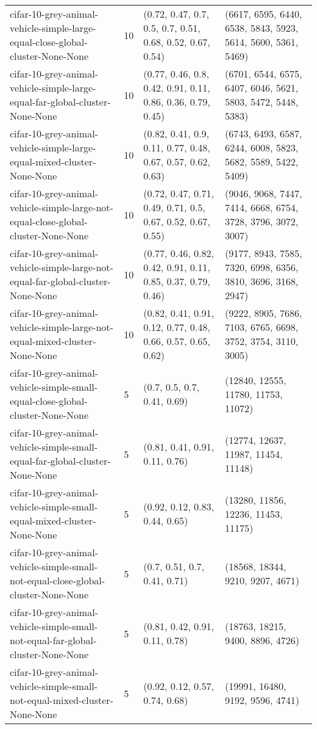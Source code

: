 \begin{longtable}{llll}
         cifar-10-grey-animal-vehicle-simple-large-equal-close-global-cluster-None-None &             10 &    (0.72, 0.47, 0.7, 0.5, 0.7, 0.51, 0.68, 0.52, 0.67, 0.54) & (6617, 6595, 6440, 6538, 5843, 5923, 5614, 5600, 5361, 5469) \\
           cifar-10-grey-animal-vehicle-simple-large-equal-far-global-cluster-None-None &             10 &  (0.77, 0.46, 0.8, 0.42, 0.91, 0.11, 0.86, 0.36, 0.79, 0.45) & (6701, 6544, 6575, 6407, 6046, 5621, 5803, 5472, 5448, 5383) \\
                cifar-10-grey-animal-vehicle-simple-large-equal-mixed-cluster-None-None &             10 &  (0.82, 0.41, 0.9, 0.11, 0.77, 0.48, 0.67, 0.57, 0.62, 0.63) & (6743, 6493, 6587, 6244, 6008, 5823, 5682, 5589, 5422, 5409) \\
     cifar-10-grey-animal-vehicle-simple-large-not-equal-close-global-cluster-None-None &             10 &  (0.72, 0.47, 0.71, 0.49, 0.71, 0.5, 0.67, 0.52, 0.67, 0.55) & (9046, 9068, 7447, 7414, 6668, 6754, 3728, 3796, 3072, 3007) \\
       cifar-10-grey-animal-vehicle-simple-large-not-equal-far-global-cluster-None-None &             10 & (0.77, 0.46, 0.82, 0.42, 0.91, 0.11, 0.85, 0.37, 0.79, 0.46) & (9177, 8943, 7585, 7320, 6998, 6356, 3810, 3696, 3168, 2947) \\
            cifar-10-grey-animal-vehicle-simple-large-not-equal-mixed-cluster-None-None &             10 & (0.82, 0.41, 0.91, 0.12, 0.77, 0.48, 0.66, 0.57, 0.65, 0.62) & (9222, 8905, 7686, 7103, 6765, 6698, 3752, 3754, 3110, 3005) \\
         cifar-10-grey-animal-vehicle-simple-small-equal-close-global-cluster-None-None &              5 &                                  (0.7, 0.5, 0.7, 0.41, 0.69) &                          (12840, 12555, 11780, 11753, 11072) \\
           cifar-10-grey-animal-vehicle-simple-small-equal-far-global-cluster-None-None &              5 &                               (0.81, 0.41, 0.91, 0.11, 0.76) &                          (12774, 12637, 11987, 11454, 11148) \\
                cifar-10-grey-animal-vehicle-simple-small-equal-mixed-cluster-None-None &              5 &                               (0.92, 0.12, 0.83, 0.44, 0.65) &                          (13280, 11856, 12236, 11453, 11175) \\
     cifar-10-grey-animal-vehicle-simple-small-not-equal-close-global-cluster-None-None &              5 &                                 (0.7, 0.51, 0.7, 0.41, 0.71) &                             (18568, 18344, 9210, 9207, 4671) \\
       cifar-10-grey-animal-vehicle-simple-small-not-equal-far-global-cluster-None-None &              5 &                               (0.81, 0.42, 0.91, 0.11, 0.78) &                             (18763, 18215, 9400, 8896, 4726) \\
            cifar-10-grey-animal-vehicle-simple-small-not-equal-mixed-cluster-None-None &              5 &                               (0.92, 0.12, 0.57, 0.74, 0.68) &                             (19991, 16480, 9192, 9596, 4741) \\
\end{longtable}
